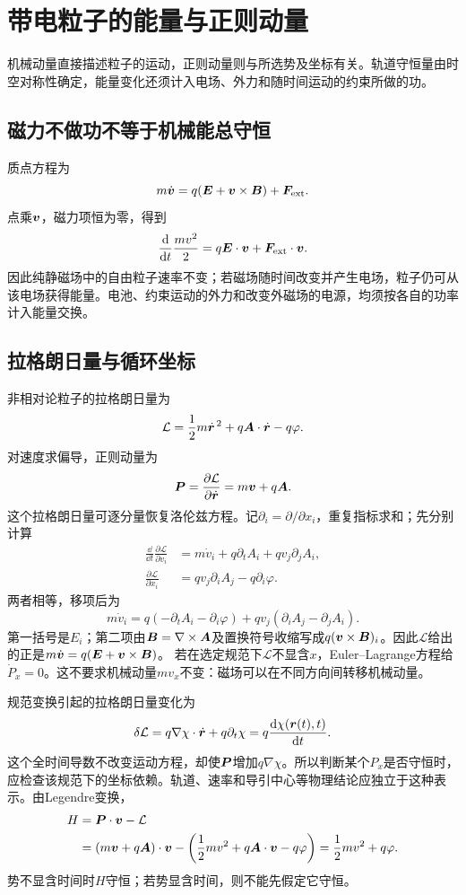 \section{带电粒子的能量与正则动量}\label{sec:i1-motion}
机械动量直接描述粒子的运动，正则动量则与所选势及坐标有关。轨道守恒量由时空对称性确定，能量变化还须计入电场、外力和随时间运动的约束所做的功。

\subsection{磁力不做功不等于机械能总守恒}
质点方程为
\[m\dot{\bm{v}}=q(\bm{E}+\bm{v}\times\bm{B})+\bm{F}_{\rm ext}.
\]
点乘$\bm{v}$，磁力项恒为零，得到
\[\frac{\mathop{}\!\mathrm d}{\mathop{}\!\mathrm d t}\frac{mv^2}{2}
=q\bm{E}\cdot\bm{v}+\bm{F}_{\rm ext}\cdot\bm{v}.
\]
因此纯静磁场中的自由粒子速率不变；若磁场随时间改变并产生电场，粒子仍可从该电场获得能量。电池、约束运动的外力和改变外磁场的电源，均须按各自的功率计入能量交换。

\subsection{拉格朗日量与循环坐标}
非相对论粒子的拉格朗日量为
\[\mathcal L=\frac12m\dot{\bm{r}}^{\,2}+q\bm{A}\cdot\dot{\bm{r}}-q\varphi.
\]
对速度求偏导，正则动量为
\[\bm{P}=\frac{\partial\mathcal L}{\partial\dot{\bm{r}}}
=m\bm{v}+q\bm{A}.
\]
这个拉格朗日量可逐分量恢复洛伦兹方程。记$\partial_i=\partial/\partial x_i$，重复指标求和；先分别计算
\[\begin{aligned}
\frac{\dd}{\dd t}\frac{\partial\mathcal L}{\partial v_i}
&=m\dot v_i+q\partial_tA_i+qv_j\partial_jA_i,\\
\frac{\partial\mathcal L}{\partial x_i}
&=qv_j\partial_iA_j-q\partial_i\varphi.
\end{aligned}\]
两者相等，移项后为
\[m\dot v_i=q(-\partial_tA_i-\partial_i\varphi)
+qv_j(\partial_iA_j-\partial_jA_i).
\]
第一括号是$E_i$；第二项由$\bm{B}=\nabla\times\bm{A}$及置换符号收缩写成$q(\bm{v}\times\bm{B})_i$。因此$\mathcal L$给出的正是$m\dot{\bm{v}}=q(\bm{E}+\bm{v}\times\bm{B})$。
若在选定规范下$\mathcal L$不显含$x$，Euler--Lagrange方程给$\dot P_x=0$。这不要求机械动量$mv_x$不变：磁场可以在不同方向间转移机械动量。

规范变换引起的拉格朗日量变化为
\[\delta\mathcal L=q\nabla\chi\cdot\dot{\bm{r}}+q\partial_t\chi
=q\frac{\mathop{}\!\mathrm d\chi(\bm{r}(t),t)}{\mathop{}\!\mathrm d t}.\]
这个全时间导数不改变运动方程，却使$\bm{P}$增加$q\nabla\chi$。所以判断某个$P_x$是否守恒时，应检查该规范下的坐标依赖。轨道、速率和导引中心等物理结论应独立于这种表示。由Legendre变换，
\[\begin{aligned}
H&=\bm{P}\cdot\bm{v}-\mathcal L\\
&=(m\bm{v}+q\bm{A})\cdot\bm{v}
-\left(\frac12mv^2+q\bm{A}\cdot\bm{v}-q\varphi\right)
=\frac12mv^2+q\varphi.
\end{aligned}\]
势不显含时间时$H$守恒；若势显含时间，则不能先假定它守恒。


